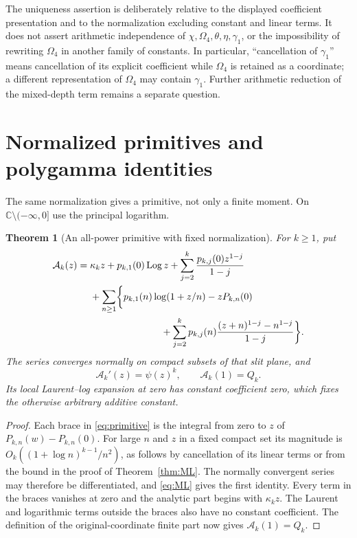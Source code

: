 \documentclass[11pt,a4paper]{article}
\numberwithin{equation}{section}
\newtheorem{theorem}{Theorem}[section]
\theoremstyle{definition}
\theoremstyle{remark}
\newcommand{\C}{\mathbb C}
\newcommand{\Log}{\operatorname{Log}}
\begin{document}
The uniqueness assertion is deliberately relative to the displayed
coefficient presentation and to the normalization excluding constant
and linear terms. It does not assert arithmetic independence of
\(\chi,\Omega_4,\theta,\eta,\gamma_1\), or the impossibility of
rewriting \(\Omega_4\) in another family of constants. In particular,
``cancellation of \(\gamma_1\)'' means cancellation of its explicit
coefficient while \(\Omega_4\) is retained as a coordinate; a
different representation of \(\Omega_4\) may contain
\(\gamma_1\). Further arithmetic reduction of the mixed-depth term
remains a separate question.


\section{Normalized primitives and polygamma identities}
\label{sec:primitives}

The same normalization gives a primitive, not only a finite moment.
On $\C\setminus(-\infty,0]$ use the principal logarithm.

\begin{theorem}[An all-power primitive with fixed normalization]
\label{thm:primitive}
For $k\ge1$, put
\begin{align}
 \mathcal A_k(z)={}&\kappa_k z+p_{k,1}(0)\Log z
             +\sum_{j=2}^k\frac{p_{k,j}(0)z^{1-j}}{1-j}
 \notag\\
 &+\sum_{n\ge1}\biggl\{
       p_{k,1}(n)\log(1+z/n)-zP_{k,n}(0)
 \notag\\
 &\hspace{26mm}
       +\sum_{j=2}^k p_{k,j}(n)
             \frac{(z+n)^{1-j}-n^{1-j}}{1-j}\biggr\}.
 \label{eq:primitive}
\end{align}
The series converges normally on compact subsets of that slit plane,
and
\begin{equation}
             \mathcal A_k'(z)=\psi(z)^k,\qquad
             \mathcal A_k(1)=Q_k.
 \label{eq:primitive-properties}
\end{equation}
Its local Laurent--log expansion at zero has constant coefficient
zero, which fixes the otherwise arbitrary additive constant.
\end{theorem}

\begin{proof}
Each brace in \eqref{eq:primitive} is the integral from zero to $z$
of $P_{k,n}(w)-P_{k,n}(0)$.  For large $n$ and $z$ in a fixed
compact set its magnitude is
$O_k((1+\log n)^{k-1}/n^2)$, as follows by cancellation of its
linear terms or from the bound in the proof of Theorem~\ref{thm:ML}.
The normally convergent series may therefore be differentiated, and
\eqref{eq:ML} gives the first identity.  Every term in the braces
vanishes at zero and the analytic part begins with $\kappa_kz$.
The Laurent and logarithmic terms outside the braces also have no
constant coefficient.  The definition of the original-coordinate
finite part now gives $\mathcal A_k(1)=Q_k$.
\end{proof}
\end{document}
